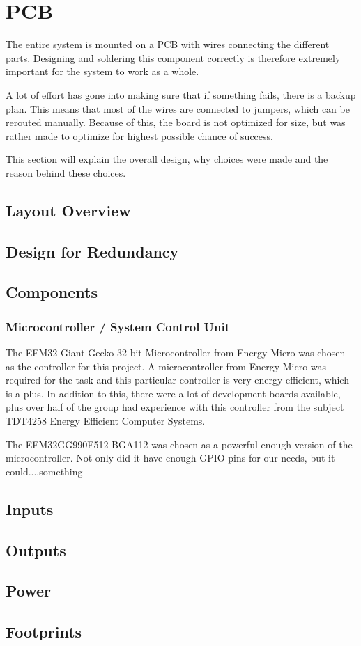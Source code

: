 \chapter{PCB}
\label{sec:pcb}

The entire system is mounted on a PCB with wires connecting the different parts.
Designing and soldering this component correctly is therefore extremely important for the system
to work as a whole.

A lot of effort has gone into making sure that if something fails, there is a backup plan.
This means that most of the wires are connected to jumpers, which can be rerouted manually.
Because of this, the board is not optimized for size, but was rather made to optimize for
highest possible chance of success.

This section will explain the overall design, why choices were made and the reason behind these choices.

\section{Layout Overview}

\section{Design for Redundancy}

\section{Components}

\subsection{Microcontroller / System Control Unit}
The EFM32 Giant Gecko 32-bit Microcontroller from Energy Micro was chosen as the controller for this project.
A microcontroller from Energy Micro was required for the task and this particular controller is
very energy efficient, which is a plus.
In addition to this, there were a lot of development boards available,
plus over half of the group had experience with this controller from the subject
TDT4258 Energy Efficient Computer Systems.

The EFM32GG990F512-BGA112 was chosen as a powerful enough version of the microcontroller.
Not only did it have enough GPIO pins for our needs, but it could....something %

\section{Inputs}

\section{Outputs}


\section{Power}

\section{Footprints}
